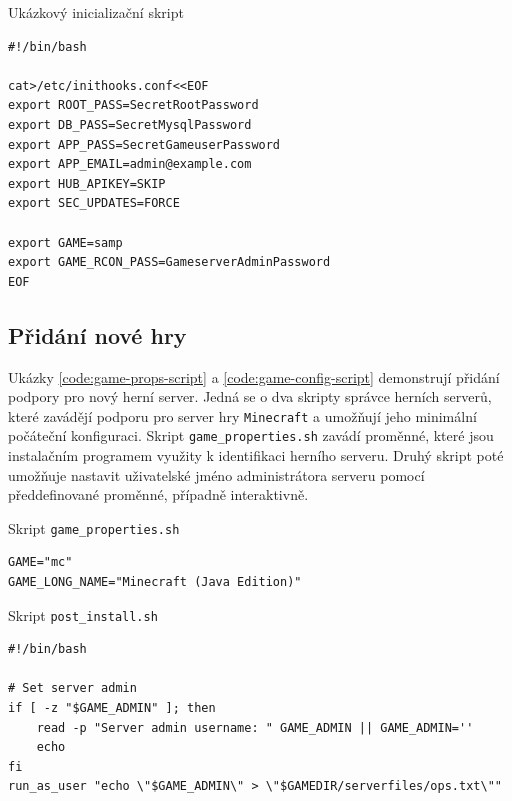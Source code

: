 \newpage

\begin{listing}[h!]
    \caption{Ukázkový inicializační skript}
    \label{code:init-script}
    \begin{verbatim}
#!/bin/bash

cat>/etc/inithooks.conf<<EOF
export ROOT_PASS=SecretRootPassword
export DB_PASS=SecretMysqlPassword
export APP_PASS=SecretGameuserPassword
export APP_EMAIL=admin@example.com
export HUB_APIKEY=SKIP
export SEC_UPDATES=FORCE

export GAME=samp
export GAME_RCON_PASS=GameserverAdminPassword
EOF
    \end{verbatim}
\end{listing}

\subsection{Přidání nové hry}

Ukázky \ref{code:game-props-script} a \ref{code:game-config-script} demonstrují přidání podpory pro nový herní server. Jedná se o dva skripty správce herních serverů,
které zavádějí podporu pro server hry \texttt{Minecraft} a umožňují jeho minimální počáteční konfiguraci.
Skript \texttt{game_properties.sh} zavádí proměnné, které jsou instalačním programem využity k identifikaci herního serveru.
Druhý skript poté umožňuje nastavit uživatelské jméno administrátora serveru pomocí předdefinované proměnné, případně interaktivně.

\begin{listing}[h]
    \caption{Skript \texttt{game_properties.sh}}
    \label{code:game-props-script}
    \begin{verbatim}
GAME="mc"
GAME_LONG_NAME="Minecraft (Java Edition)"
    \end{verbatim}
\end{listing}

\begin{listing}[h]
    \caption{Skript \texttt{post_install.sh}}
    \label{code:game-config-script}
    \begin{verbatim}
#!/bin/bash

# Set server admin
if [ -z "$GAME_ADMIN" ]; then
    read -p "Server admin username: " GAME_ADMIN || GAME_ADMIN=''
    echo
fi
run_as_user "echo \"$GAME_ADMIN\" > \"$GAMEDIR/serverfiles/ops.txt\""
    \end{verbatim}
\end{listing}

